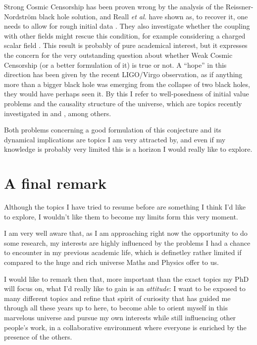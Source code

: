 \documentclass[12pt, a4paper]{article}
\begin{document}
Strong Cosmic Censorship has been proven wrong by the analysis of the Reissner-Nordstr\"om black hole solution, and Reall \emph{et al.} have shown as, to recover it, one needs to allow for rough initial data \cite{dias2018strong}. They also investigate whether the coupling with other fields might rescue this condition, for example considering a charged scalar field \cite{Dias:2018ufh}.
This result is probably of pure academical interest, but it expresses the concern for the very outstanding question about whether Weak Cosmic Censorship (or a better formulation of it) is true or not. 
A ``hope'' in this direction has been given by the recent LIGO/Virgo observation, as if anything more than a bigger black hole was emerging from the collapse of two black holes, they would have perhaps seen it. By this I refer to well-posedness of initial value problems and the causality structure of the universe, which are topics recently investigated in \cite{Kovacs:2020pns} and \cite{Reall:2021voz}, among others.

Both problems concerning a good formulation of this conjecture and its dynamical implications are topics I am very attracted by, and even if my knowledge is probably very limited this is a horizon I would really like to explore.

	\section{A final remark}
Although the topics I have tried to resume before are something I think I'd like to  explore, I wouldn't like them to become my limits form this very moment. 

I am very well aware that, as I am approaching right now the opportunity to do some research, my interests are highly influenced by the problems I had a chance to encounter in my previous academic life, which is definetley rather limited if compared to the huge and rich universe Maths and Physics offer to us.

I would like to remark then that, more important than the exact topics my PhD will focus on, what I'd really like to gain is an \emph{attitude}: I want to be exposed to many different topics and refine that spirit of curiosity that has guided me through all these years up to here, to become able to orient myself in this marvelous universe and pursue my own interests while still influencing other people's work, in a collaborative environment where everyone is enriched by the presence of the others.

\clearpage


\printbibliography
\end{document}
